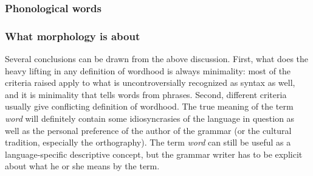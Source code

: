 \documentclass[UTF8, a4paper, oneside, scheme=plain]{ctexart}
\newcommand*{\term}[1]{\emph{#1}}
\begin{document}
\subsubsection{Phonological words}\label{sec:phonological-word}

\subsubsection{What morphology is about}\label{sec:morphology-coverage}

Several conclusions can be drawn from the above discussion.
First, what does the heavy lifting in any definition of wordhood 
is always minimality:
most of the criteria raised apply to what is uncontroversially recognized as syntax as well,
and it is minimality that tells words from phrases.
Second, different criteria usually give conflicting definition of wordhood.
The true meaning of the term \term{word}
will definitely contain some idiosyncrasies 
of the language in question as well as the personal preference of the author of the grammar
(or the cultural tradition, especially the orthography).
The term \term{word} can still be useful as a language-specific descriptive concept,
but the grammar writer has to be explicit about what he or she means by the term.
\end{document}
